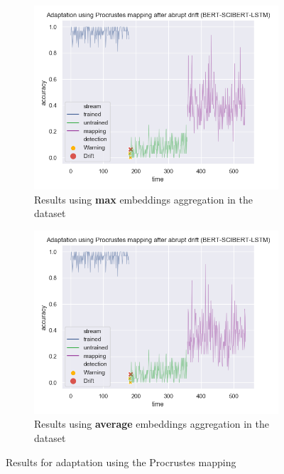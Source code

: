 \documentclass[12pt]{extreport}
\begin{document}
\begin{figure}[H]
\centering
\begin{subfigure}{.49\textwidth}
\centering
\includegraphics[width=\linewidth]{assets/addressing-change/procrustes_lstm_wos_1_BERT_SCIBERT_5000_words_max.png}
\caption{Results using \textbf{max} embeddings aggregation in the dataset}
\label{fig:proc-max}
\end{subfigure}
\begin{subfigure}{.49\textwidth}
\centering
\includegraphics[width=\linewidth]{assets/addressing-change/procrustes_lstm_wos_1_BERT_SCIBERT_5000_words_average.png}
\caption{Results using \textbf{average} embeddings aggregation in the dataset}
\label{fig:proc-average}
\end{subfigure}
\caption{Results for adaptation using the Procrustes mapping}
\label{fig:proc-results}
\end{figure}
\end{document}
